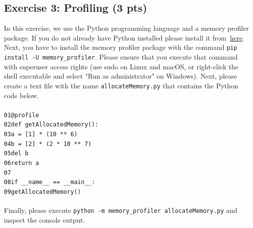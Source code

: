 \documentclass [11pt, a4wide, twoside]{article}
\begin{document}
\subsection*{Exercise 3: Profiling (3 pts)}
In this exercise, we use the Python programming language and a memory profiler package. If you do not already have Python installed please install it from~\href{https://www.python.org/downloads/}{here}. Next, you have to install the memory profiler package with the command \texttt{pip install -U memory\_profiler}. Please ensure that you execute that command with superuser access rights (use sudo on Linux and macOS, or right-click the shell executable and select "Run as administrator" on Windows). Next, please create a text file with the name \texttt{allocateMemory.py} that contains the Python code below.\\\\
\texttt{01\hspace*{1.0cm}@profile\\
02\hspace*{1.0cm}def getAllocatedMemory():\\
03\hspace*{1.0cm}\hspace*{0.5cm}a = [1] * (10 ** 6)\\
04\hspace*{1.0cm}\hspace*{0.5cm}b = [2] * (2 * 10 ** 7)\\
05\hspace*{1.0cm}\hspace*{0.5cm}del b\\
06\hspace*{1.0cm}\hspace*{0.5cm}return a\\
07\hspace*{1.0cm}\\
08\hspace*{1.0cm}if \_\_name\_\_ == \textquotesingle\_\_main\_\_\textquotesingle:\\
09\hspace*{1.0cm}\hspace*{0.5cm}getAllocatedMemory()\\
}\\
Finally, please execute \texttt{python -m memory\_profiler allocateMemory.py} and inspect the console output.
\end{document}

